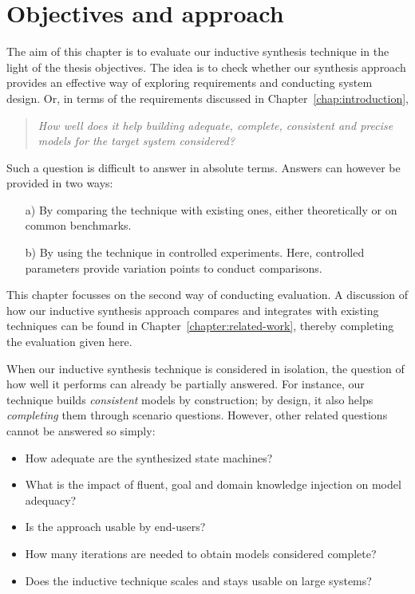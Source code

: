 \section{Objectives and approach\label{section:evaluation-objectives-and-approach}}

The aim of this chapter is to evaluate our inductive synthesis technique in the light of the thesis objectives. The idea is to check whether our synthesis approach provides an effective way of exploring requirements and conducting system design. Or, in terms of the requirements discussed in Chapter~\ref{chap:introduction},

\begin{quotation}
\emph{How well does it help building \emph{adequate}, \emph{complete}, \emph{consistent} and \emph{precise} models for the target system considered?}
\end{quotation}

Such a question is difficult to answer in absolute terms. Answers can however be provided in two ways:
\begin{enumerate}
\item[a)] By comparing the technique with existing ones, either theoretically or on common benchmarks.
\item[b)] By using the technique in controlled experiments. Here, controlled parameters provide variation points to conduct comparisons.
\end{enumerate}
This chapter focusses on the second way of conducting evaluation. A discussion of how our inductive synthesis approach compares and integrates with existing techniques can be found in Chapter~\ref{chapter:related-work}, thereby completing the evaluation given here.

When our inductive synthesis technique is considered in isolation, the question of how well it performs can already be partially answered. For instance, our technique builds \emph{consistent} models by construction; by design, it also helps \emph{completing} them through scenario questions. However, other related questions cannot be answered so simply:
\begin{itemize}
\item How adequate are the synthesized state machines? 
\item What is the impact of fluent, goal and domain knowledge injection on model adequacy?
\item Is the approach usable by end-users? 
\item How many iterations are needed to obtain models considered complete?
\item Does the inductive technique scales and stays usable on large systems?
\end{itemize}

